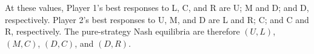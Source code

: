 \documentclass{assignment}
\begin{document}
\begin{solution}
\begin{enumerate}
              At these values, Player 1's best responses to L, C, and R are U;
              M and D; and D, respectively. Player 2's best responses to U, M,
              and D are L and R; C; and C and R, respectively. The pure-strategy
              Nash equilibria are therefore \((U,L)\), \((M,C)\), \((D,C)\), and
              \((D,R)\).
    \end{enumerate}
\end{solution}
\end{document}
